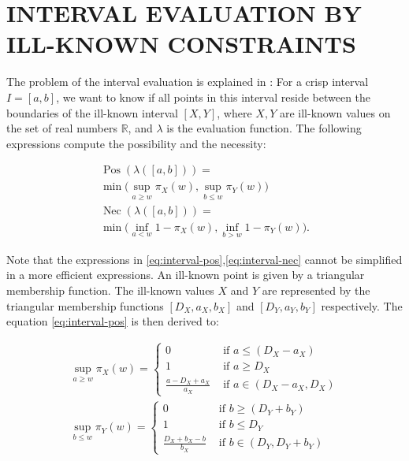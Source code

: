 \documentclass[twoside,twocolumn,a4paper]{article}
\newcommand{\Pos}{\operatorname{Pos}}
\newcommand{\Nec}{\operatorname{Nec}}
\begin{document}
\section{\label{sec:interval-eval}INTERVAL EVALUATION BY ILL-KNOWN CONSTRAINTS}
The problem of the interval evaluation is explained in \cite{Pon11}: For a crisp interval $I = \left[ a, b \right]$, we want to know if all points in this interval reside between the boundaries of the ill-known interval $\left[ X , Y \right]$, where $X,Y$ are ill-known values on the set of real numbers $\mathbb{R}$, and $\lambda$ is the evaluation function. The following expressions compute the possibility and the necessity: 

\begin{eqnarray}
\label{eq:interval-pos}
\Pos\left(\lambda([a,b])\right)=\\
\nonumber
\min\bigg(\sup_{a\geq w}\pi_{X}(w),\sup_{b\leq w}\pi_{Y}(w)\bigg)\\
\label{eq:interval-nec}
\Nec\left(\lambda([a,b])\right)=\\
\nonumber
\min\bigg(\inf_{a<w}1-\pi_{X}(w),\inf_{b>w}1-\pi_{Y}(w)\bigg).
\end{eqnarray}

Note that the expressions in \eqref{eq:interval-pos},\eqref{eq:interval-nec} cannot be simplified in a more efficient expressions.
An ill-known point is given by a triangular membership function. The ill-known values $X$ and $Y$ are represented by the triangular membership functions $\left[D_X,a_X,b_X \right]$ and $\left[D_Y,a_Y,b_Y \right]$ respectively. The equation \eqref{eq:interval-pos} is then derived to:

\begin{eqnarray}
\label{eq:interval-pos-triangular-a}
\sup_{a\geq w}\pi_{X}(w)=
\begin{cases}
0 & \mbox{\ if\ } a \leq \left( D_X - a_X \right) \\
1 & \mbox{\ if\ } a \geq D_X \\
 \frac{a-D_X+a_X}{a_X} & \mbox{\ if\ } a \in \left(D_X-a_X,D_X \right)
\end{cases}\\
\label{eq:interval-pos-triangular-b}
\sup_{b\leq w}\pi_{Y}(w)=
\begin{cases}
0 & \mbox{\ if\ } b \geq \left( D_Y + b_Y \right) \\
1 & \mbox{\ if\ } b \leq D_Y \\
 \frac{D_X+b_X-b}{b_X} & \mbox{\ if\ } b \in \left(D_Y,D_Y+b_Y \right) 
\end{cases}
\end{eqnarray}
\end{document}
